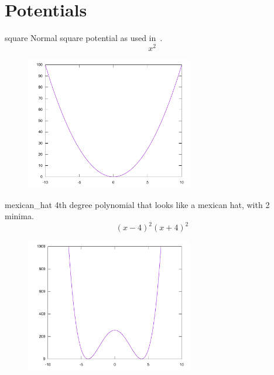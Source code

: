 \documentclass[11pt,DIV=10,final]{scrreprt} %
\begin{document}
{\section{Potentials}\label{sec:potentials}
\begin{description}
\begin{minipage}{\textwidth}
  \item[square] Normal square potential as used in~\cite{hall2013quantum}.
        \[
        x^{2}
        \]
        \begin{figure}[H]
          \centering
          \includegraphics[width=0.65\textwidth]{plots/square.pdf}
        \end{figure}
\end{minipage}
\begin{minipage}{\textwidth}
  \item[mexican\_hat] 4th degree polynomial that looks like a mexican hat, with 2 minima.
        \[
        (x-4)^{2}(x + 4)^{2}
        \]
        \begin{figure}[H]
          \centering
          \includegraphics[width=0.65\textwidth]{plots/mexican_hat.pdf}
        \end{figure}
\end{minipage}

\end{description}}
\end{document}
